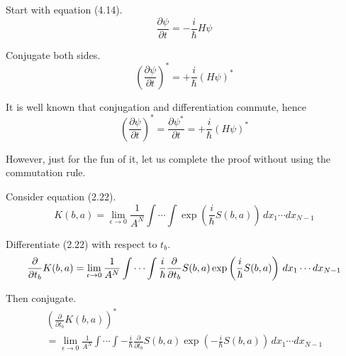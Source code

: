 


\bigskip
Start with equation (4.14).
\begin{equation*}
\frac{\partial\psi}{\partial t}=-\frac{i}{\hbar}H\psi
\tag{4.14}
\end{equation*}

Conjugate both sides.
\begin{equation*}
\left(\frac{\partial\psi}{\partial t}\right)^*=+\frac{i}{\hbar}(H\psi)^*
\end{equation*}

It is well known that conjugation and differentiation commute, hence
\begin{equation*}
\left(\frac{\partial\psi}{\partial t}\right)^*=\frac{\partial\psi^*}{\partial t}=+\frac{i}{\hbar}(H\psi)^*
\end{equation*}

However, just for the fun of it, let us complete the proof without using the commutation rule.

\bigskip
Consider equation (2.22).
\begin{equation*}
K(b,a)=\lim_{\epsilon\rightarrow0}\frac{1}{A^N}\int\cdots\int
\exp\left(\frac{i}{\hbar}S(b,a)\right)\,dx_1\cdots dx_{N-1}
\tag{2.22}
\end{equation*}

Differentiate (2.22) with respect to $t_b$.
\begin{equation*}
\frac{\partial}{\partial t_b}K(b,a)
\\
=
\lim_{\epsilon\rightarrow0}\frac{1}{A^N}
\int\cdots\int
\frac{i}{\hbar}\frac{\partial}{\partial t_b}S(b,a)
\exp\left(\frac{i}{\hbar}S(b,a)\right)\,dx_1\cdots dx_{N-1}
\end{equation*}

Then conjugate.
\begin{multline*}
\left(\frac{\partial}{\partial t_b}K(b,a)\right)^*
\\
{}=\lim_{\epsilon\rightarrow0}\frac{1}{A^N}
\int\cdots\int
-\frac{i}{\hbar}\frac{\partial}{\partial t_b}S(b,a)
\exp\left(-\frac{i}{\hbar}S(b,a)\right)\,dx_1\cdots dx_{N-1}
\end{multline*}


